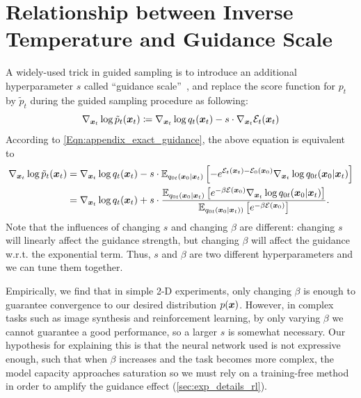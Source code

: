 \section{Relationship between Inverse Temperature and Guidance Scale}
A widely-used trick in guided sampling is to introduce an additional hyperparameter $s$ called ``guidance scale''~\citep{diffusion_beat_gan}, and replace the score function for $p_t$ by $\tilde p_t$ during the guided sampling procedure as following:
\begin{equation}
\label{Eqn:appendix_guidance_scale}
    \nabla_{{\bm{x}}_t}\log \tilde p_t({\bm{x}}_t) \coloneqq \nabla_{{\bm{x}}_t}\log q_t({\bm{x}}_t) - s \cdot \nabla_{{\bm{x}}_t}{\mathcal{E}}_t({\bm{x}}_t)
\end{equation}
According to \eqref{Eqn:appendix_exact_guidance}, the above equation is equivalent to
\begin{equation*}
\begin{split}
    \nabla_{{\bm{x}}_t}\log \tilde p_t({\bm{x}}_t) &= \nabla_{{\bm{x}}_t}\log q_t({\bm{x}}_t)
    - s\cdot \mathbb{E}_{q_{0t}({\bm{x}}_0|{\bm{x}}_t)}\left[-e^{{\mathcal{E}}_t({\bm{x}}_t)-{\mathcal{E}}_0({\bm{x}}_0)}\nabla_{{\bm{x}}_t}\log q_{0t}({\bm{x}}_0|{\bm{x}}_t)\right] \\
    &= \nabla_{{\bm{x}}_t}\log q_t({\bm{x}}_t)
    + s\cdot \frac{\mathbb{E}_{q_{0t}({\bm{x}}_0|{\bm{x}}_t)}\left[e^{-\beta{\mathcal{E}}({\bm{x}}_0)}\nabla_{{\bm{x}}_t}\log q_{0t}({\bm{x}}_0|{\bm{x}}_t)\right]}{\mathbb{E}_{q_{0t}({\bm{x}}_0|{\bm{x}}_t))}\left[e^{-\beta{\mathcal{E}}({\bm{x}}_0)}\right]}.
\end{split}
\end{equation*}
Note that the influences of changing $s$ and changing $\beta$ are different: changing $s$ will linearly affect the guidance strength, but changing $\beta$ will affect the guidance w.r.t. the exponential term. Thus, $s$ and $\beta$ are two different hyperparameters and we can tune them together.

Empirically, we find that in simple 2-D experiments, only changing $\beta$ is enough to guarantee convergence to our desired distribution $p({\bm{x}})$. However, in complex tasks such as image synthesis and reinforcement learning, by only varying $\beta$ we cannot guarantee a good performance, so a larger $s$ is somewhat necessary. Our hypothesis for explaining this is that the neural network used is not expressive enough, such that when $\beta$ increases and the task becomes more complex, the model capacity approaches saturation so we must rely on a training-free method in order to amplify the guidance effect (\cref{sec:exp_details_rl}).







